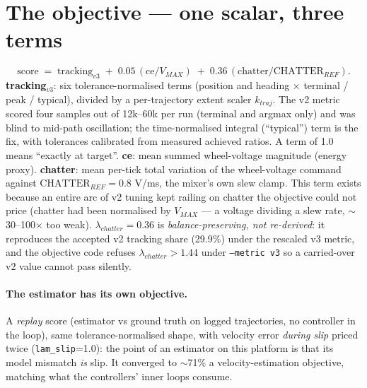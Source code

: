 \documentclass[11pt]{article}
\begin{document}
\section{The objective --- one scalar, three terms}
\begin{equation}
\text{score} \;=\; \text{tracking}_{v3} \;+\; 0.05\,(\text{ce}/V_{MAX}) \;+\;
0.36\,(\text{chatter}/\text{CHATTER}_{REF}).
\end{equation}
\textbf{tracking$_{v3}$}: six tolerance-normalised terms (position and heading $\times$
terminal / peak / typical), divided by a per-trajectory extent scaler $k_{traj}$. The v2
metric scored four samples out of 12k--60k per run (terminal and argmax only) and was
blind to mid-path oscillation; the time-normalised integral (``typical'') term is the
fix, with tolerances calibrated from measured achieved ratios. A term of 1.0 means
``exactly at target''. \textbf{ce}: mean summed wheel-voltage magnitude (energy proxy).
\textbf{chatter}: mean per-tick total variation of the wheel-voltage command against
$\text{CHATTER}_{REF}=0.8$ V/ms, the mixer's own slew clamp. This term exists because an
entire arc of v2 tuning kept railing on chatter the objective could not price (chatter
had been normalised by $V_{MAX}$ --- a voltage dividing a slew rate, $\sim$30--100$\times$
too weak). $\lambda_{chatter}=0.36$ is \emph{balance-preserving, not re-derived}: it
reproduces the accepted v2 tracking share (29.9\%) under the rescaled v3 metric, and the
objective code refuses $\lambda_{chatter}>1.44$ under \texttt{--metric v3} so a
carried-over v2 value cannot pass silently.

\paragraph{The estimator has its own objective.} A \emph{replay} score (estimator vs
ground truth on logged trajectories, no controller in the loop), same
tolerance-normalised shape, with velocity error \emph{during slip} priced twice
(\texttt{lam\_slip}=1.0): the point of an estimator on this platform is that its model
mismatch \emph{is} slip. It converged to $\sim$71\% a velocity-estimation objective,
matching what the controllers' inner loops consume.
\end{document}
